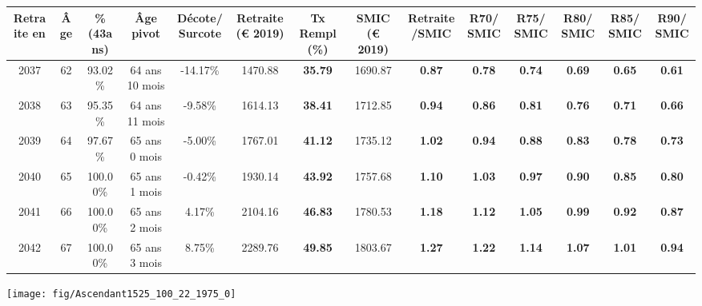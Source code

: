 \begin{adjustbox}{max width=\textwidth} 
\begin{tabular}[htb]{|c|c||c|c|c||c|c||c|c||c|c|c|c|c|} 
\hline 
 Retraite en &  Âge &  \%(43ans) &  Âge pivot &  Décote/Surcote &  Retraite (\euro{} 2019) &  Tx Rempl(\%) &  SMIC (\euro{} 2019) &  Retraite/SMIC &  R70/SMIC &  R75/SMIC &  R80/SMIC &  R85/SMIC &  R90/SMIC \\ 
\hline \hline 
 2037 &  62 &  93.02\% &  64 ans 10 mois &  -14.17\% &  1470.88 &  {\bf 35.79} &  1690.87 &  {\bf {\color{red} 0.87}} &  {\bf {\color{red} 0.78}} &  {\bf {\color{red} 0.74}} &  {\bf {\color{red} 0.69}} &  {\bf {\color{red} 0.65}} &  {\bf {\color{red} 0.61}} \\ 
\hline 
 2038 &  63 &  95.35\% &  64 ans 11 mois &  -9.58\% &  1614.13 &  {\bf 38.41} &  1712.85 &  {\bf {\color{red} 0.94}} &  {\bf {\color{red} 0.86}} &  {\bf {\color{red} 0.81}} &  {\bf {\color{red} 0.76}} &  {\bf {\color{red} 0.71}} &  {\bf {\color{red} 0.66}} \\ 
\hline 
 2039 &  64 &  97.67\% &  65 ans 0 mois &  -5.00\% &  1767.01 &  {\bf 41.12} &  1735.12 &  {\bf 1.02} &  {\bf {\color{red} 0.94}} &  {\bf {\color{red} 0.88}} &  {\bf {\color{red} 0.83}} &  {\bf {\color{red} 0.78}} &  {\bf {\color{red} 0.73}} \\ 
\hline 
 2040 &  65 &  100.00\% &  65 ans 1 mois &  -0.42\% &  1930.14 &  {\bf 43.92} &  1757.68 &  {\bf 1.10} &  {\bf 1.03} &  {\bf {\color{red} 0.97}} &  {\bf {\color{red} 0.90}} &  {\bf {\color{red} 0.85}} &  {\bf {\color{red} 0.80}} \\ 
\hline 
 2041 &  66 &  100.00\% &  65 ans 2 mois &  4.17\% &  2104.16 &  {\bf 46.83} &  1780.53 &  {\bf 1.18} &  {\bf 1.12} &  {\bf 1.05} &  {\bf {\color{red} 0.99}} &  {\bf {\color{red} 0.92}} &  {\bf {\color{red} 0.87}} \\ 
\hline 
 2042 &  67 &  100.00\% &  65 ans 3 mois &  8.75\% &  2289.76 &  {\bf 49.85} &  1803.67 &  {\bf 1.27} &  {\bf 1.22} &  {\bf 1.14} &  {\bf 1.07} &  {\bf 1.01} &  {\bf {\color{red} 0.94}} \\ 
\hline 
\hline 
\end{tabular} 
\end{adjustbox} 
 
 \vspace{0.1cm} 

 {\hspace{-2.2cm}\texttt{[image: fig/Ascendant1525\_100\_22\_1975\_0]}} 

\newpage 
 
